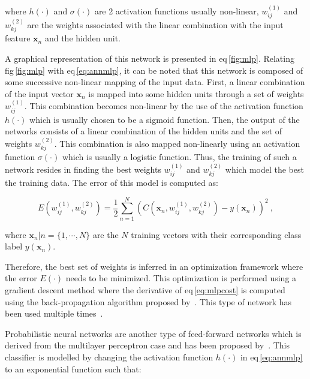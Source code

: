\begin{enumerate}[leftmargin=*]
  \noindent where $h(\cdot)$ and $\sigma(\cdot)$ are 2 activation functions
  usually non-linear, $w_{ij}^{(1)}$ and $ w_{kj}^{(2)}$ are the weights
  associated with the linear combination with the input feature $\mathbf{x}_n$
  and the hidden unit.

  

  A graphical representation of this network is presented in \acs{eq}\,\ref{fig:mlp}.
  Relating \acs{fig}\,\ref{fig:mlp} with \acs{eq}\,\eqref{eq:annmlp}, it can be
  noted that this network is composed of some successive non-linear mapping of
  the input data.
  First, a linear combination of the input vector $\mathbf{x}_n$ is mapped into
  some hidden units through a set of weights $w_{ij}^{(1)}$.
  This combination becomes non-linear by the use of the activation function
  $h(\cdot)$ which is usually chosen to be a sigmoid function.
  Then, the output of the networks consists of a linear combination of the
  hidden units and the set of weights $w_{kj}^{(2)}$.
  This combination is also mapped non-linearly using an activation function
  $\sigma(\cdot)$ which is usually a logistic function.
  Thus, the training of such a network resides in finding the best weights
  $w_{ij}^{(1)}$ and $ w_{kj}^{(2)}$ which model the best the training data.
  The error of this model is computed as:

  \begin{equation}
    E(w_{ij}^{(1)},w_{kj}^{(2)}) = \frac{1}{2} \sum_{n=1}^{N} \left( C(\mathbf{x}_n,w_{ij}^{(1)},w_{kj}^{(2)}) - y(\mathbf{x}_n) \right) ^{2} \ ,
    \label{eq:mlpcost}
  \end{equation}

  \noindent where $\mathbf{x}_n|n=\{1,\cdots,N\}$ are the $N$ training vectors
  with their corresponding class label $y(\mathbf{x}_n)$.

  Therefore, the best set of weights is inferred in an optimization framework
  where the error $E(\cdot)$ needs to be minimized.
  This optimization is performed using a gradient descent method where the
  derivative of \acs{eq}\,\eqref{eq:mlpcost} is computed using the
  back-propagation algorithm proposed by~\cite{Rumelhart1988}.
  This type of network has been used multiple
  times~\cite{Matulewicz2013,Parfait2012,trigui2017automatic,trigui2016classification,rampun2016computer}.

  

  Probabilistic neural networks are another type of feed-forward networks which
  is derived from the multilayer perceptron case and has been proposed
  by~\cite{Specht1988}.
  This classifier is modelled by changing the activation function $h(\cdot)$ in
  \acs{eq}\,\eqref{eq:annmlp} to an exponential function such that:


\end{enumerate}
